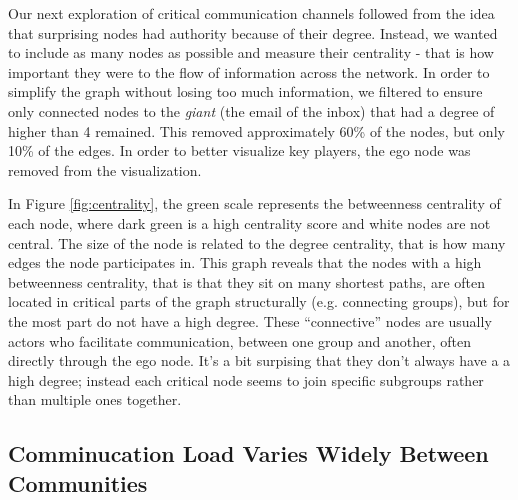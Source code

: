 \documentclass[11pt,letterpaper]{article}
\begin{document}
Our next exploration of critical communication channels followed from the idea that surprising nodes had authority because of their degree. Instead, we wanted to include as many nodes as possible and measure their centrality - that is how important they were to the flow of information across the network. In order to simplify the graph without losing too much information, we filtered to ensure only connected nodes to the \textit{giant} (the email of the inbox) that had a degree of higher than 4 remained. This removed approximately 60\% of the nodes, but only 10\% of the edges. In order to better visualize key players, the ego node was removed from the visualization.

In Figure \ref{fig:centrality}, the green scale represents the betweenness centrality of each node, where dark green is a high centrality score and white nodes are not central. The size of the node is related to the degree centrality, that is how many edges the node participates in. This graph reveals that the nodes with a high betweenness centrality, that is that they sit on many shortest paths, are often located in critical parts of the graph structurally (e.g. connecting groups), but for the most part do not have a high degree. These ``connective'' nodes are usually actors who facilitate communication, between one group and another, often directly through the ego node. It's a bit surpising that they don't always have a a high degree; instead each critical node seems to join specific subgroups rather than multiple ones together.

\subsection*{Comminucation Load Varies Widely Between Communities}
\end{document}
